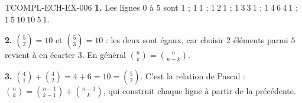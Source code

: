 \begin{corrige}{TCOMPL-ECH-EX-006}
\textbf{1.} Les lignes $0$ à $5$ sont $1$ ; $1\ 1$ ; $1\ 2\ 1$ ;
$1\ 3\ 3\ 1$ ; $1\ 4\ 6\ 4\ 1$ ; $1\ 5\ 10\ 10\ 5\ 1$.

\textbf{2.} $\binom52=10$ et $\binom53=10$ : les deux sont égaux, car choisir
$2$ éléments parmi $5$ revient à en écarter $3$. En général
$\binom nk=\binom n{n-k}$.

\textbf{3.} $\binom41+\binom42=4+6=10=\binom52$. C'est la relation de Pascal :
$\binom nk=\binom{n-1}{k-1}+\binom{n-1}{k}$, qui construit chaque ligne à
partir de la précédente.
\end{corrige}
